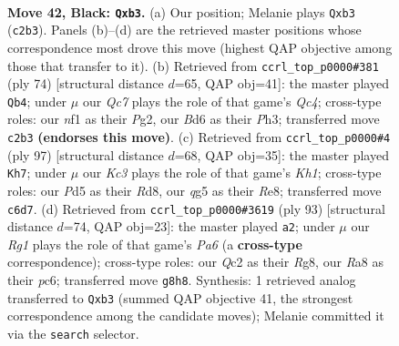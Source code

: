 \documentclass[11pt]{article}
\begin{document}
\clearpage

\begin{figure}[p]\centering
\begin{subfigure}{0.46\textwidth}\centering
\resizebox{\linewidth}{!}{%
\newchessgame
\chessboard[
  setfen={r5r1/p5pp/2kb4/3p2QP/p2P2P1/1R2P2K/2q5/5N2 b - - 0 42},
  showmover=false,
  pgfstyle=straightmove, color=movearrow, markmove={c2-b3}
]}
\caption{}
\end{subfigure}\hfill
\begin{subfigure}{0.46\textwidth}\centering
\resizebox{\linewidth}{!}{%
\newchessgame
\chessboard[
  setfen={8/5p1k/4p2p/3r1p2/p1Q5/P1P1P2P/2q2PP1/5RK1 w - - 6 38},
  showmover=false,
  pgfstyle=straightmove, color=movearrow, markmove={c4-b4}
]}
\caption{}
\end{subfigure}
\\[4pt]
\begin{subfigure}{0.46\textwidth}\centering
\resizebox{\linewidth}{!}{%
\newchessgame
\chessboard[
  setfen={3rr2k/5p2/6pp/pPqpP3/5P1Q/1P5P/4B1PK/4R3 b - - 2 49},
  showmover=false,
  pgfstyle=straightmove, color=movearrow, markmove={h8-h7}
]}
\caption{}
\end{subfigure}\hfill
\begin{subfigure}{0.46\textwidth}\centering
\resizebox{\linewidth}{!}{%
\newchessgame
\chessboard[
  setfen={6rk/8/2P1N1q1/r3Pp2/2p2P1b/p4Q1P/2B3P1/3R3K b - - 0 47},
  showmover=false,
  pgfstyle=straightmove, color=movearrow, markmove={a3-a2}
]}
\caption{}
\end{subfigure}
\caption{\textbf{Move 42, Black: \texttt{Qxb3}.} (a) Our position; Melanie plays \texttt{Qxb3} (\texttt{c2b3}). Panels (b)--(d) are the retrieved master positions whose correspondence most drove this move (highest QAP objective among those that transfer to it). (b) Retrieved from \texttt{ccrl\_top\_p0000\#381} (ply 74) [structural distance $d$=65, QAP obj=41]: the master played \texttt{Qb4}; under $\mu$ our \emph{Qc7} plays the role of that game's \emph{Qc4}; cross-type roles: our \emph{n}f1 as their \emph{P}g2, our \emph{B}d6 as their \emph{P}h3; transferred move \texttt{c2b3} \textbf{(endorses this move)}. (c) Retrieved from \texttt{ccrl\_top\_p0000\#4} (ply 97) [structural distance $d$=68, QAP obj=35]: the master played \texttt{Kh7}; under $\mu$ our \emph{Kc3} plays the role of that game's \emph{Kh1}; cross-type roles: our \emph{P}d5 as their \emph{R}d8, our \emph{q}g5 as their \emph{R}e8; transferred move \texttt{c6d7}. (d) Retrieved from \texttt{ccrl\_top\_p0000\#3619} (ply 93) [structural distance $d$=74, QAP obj=23]: the master played \texttt{a2}; under $\mu$ our \emph{Rg1} plays the role of that game's \emph{Pa6} (a \textbf{cross-type} correspondence); cross-type roles: our \emph{Q}c2 as their \emph{R}g8, our \emph{R}a8 as their \emph{p}c6; transferred move \texttt{g8h8}. Synthesis: 1 retrieved analog transferred to \texttt{Qxb3} (summed QAP objective 41, the strongest correspondence among the candidate moves); Melanie committed it via the \texttt{search} selector.}
\label{fig:thought-m83}
\end{figure}
\end{document}
